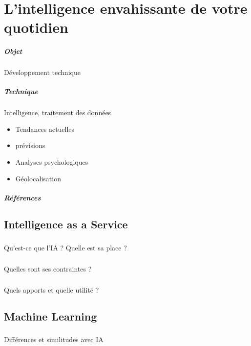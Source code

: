 \chapter{L'intelligence envahissante de votre quotidien}
\paragraph{Objet} Développement technique
\paragraph{Technique} Intelligence, traitement des données
\begin{itemize}
    \item Tendances actuelles
    \item prévisions
    \item Analyses psychologiques
    \item Géolocalisation
\end{itemize}

\paragraph{Références}
\cite{Asimov:0}
\cite{Moore:0}
\cite{MachineLearning:0}
\cite{MachineLearning:1}
\cite{ProgrammableCity:0}
\cite{ProgrammableCity:1}
\cite{GhostInTheShell}
\cite{PsychoPass}

\section{Intelligence as a Service}
\paragraph{} Qu'est-ce que l'IA ? Quelle est sa place ?
\paragraph{} Quelles sont ses contraintes ?
\paragraph{} Quels apports et quelle utilité ?

\section{Machine Learning}
\paragraph{} Différences et similitudes avec IA
